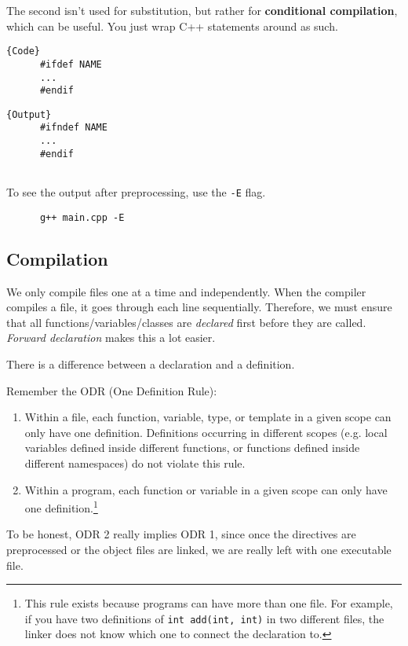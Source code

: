 \documentclass{article}
\begin{document}
    The second isn't used for substitution, but rather for \textbf{conditional compilation}, which can be useful. You just wrap C++ statements around as such.

    \noindent\begin{minipage}{.5\textwidth}
    \begin{lstlisting}[]{Code}
      #ifdef NAME 
      ... 
      #endif
    \end{lstlisting}
    \end{minipage}
    \hfill
    \begin{minipage}{.49\textwidth}
    \begin{lstlisting}[]{Output}
      #ifndef NAME 
      ... 
      #endif
      
    \end{lstlisting}
    \end{minipage} 

    To see the output after preprocessing, use the \texttt{-E} flag. 
    \begin{lstlisting}
      g++ main.cpp -E
    \end{lstlisting}

  \subsection{Compilation} 

    We only compile files one at a time and independently. When the compiler compiles a file, it goes through each line sequentially. Therefore, we must ensure that all functions/variables/classes are \textit{declared} first before they are called. \textit{Forward declaration} makes this a lot easier. 

    There is a difference between a declaration and a definition. 

    \begin{definition}[ODR]
      Remember the ODR (One Definition Rule): 
      \begin{enumerate}
        \item Within a file, each function, variable, type, or template in a given scope can only have one definition. Definitions occurring in different scopes (e.g. local variables defined inside different functions, or functions defined inside different namespaces) do not violate this rule. 

        \item Within a program, each function or variable in a given scope can only have one definition.\footnote{This rule exists because programs can have more than one file. For example, if you have two definitions of \texttt{int add(int, int)} in two different files, the linker does not know which one to connect the declaration to.}
      \end{enumerate}
      To be honest, ODR 2 really implies ODR 1, since once the directives are preprocessed or the object files are linked, we are really left with one executable file. 
    \end{definition} 
\end{document}
